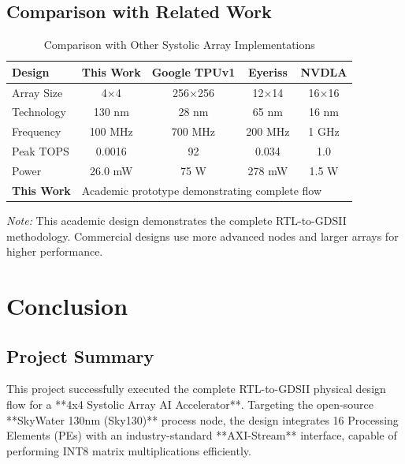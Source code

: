 \documentclass[12pt,a4paper]{article}
\begin{document}
\newpage

\subsection{Comparison with Related Work}

\begin{table}[H]
\centering
\caption{Comparison with Other Systolic Array Implementations}
\label{tab:comparison}
\begin{tabular}{@{}lcccc@{}}
\toprule
\textbf{Design} & \textbf{This Work} & \textbf{Google TPUv1} & \textbf{Eyeriss} & \textbf{NVDLA} \\
\midrule
Array Size & 4×4 & 256×256 & 12×14 & 16×16 \\
Technology & 130 nm & 28 nm & 65 nm & 16 nm \\
Frequency & 100 MHz & 700 MHz & 200 MHz & 1 GHz \\
Peak TOPS & 0.0016 & 92 & 0.034 & 1.0 \\
Power & 26.0 mW & 75 W & 278 mW & 1.5 W \\
\midrule
\textbf{This Work} & \multicolumn{4}{l}{Academic prototype demonstrating complete flow} \\
\bottomrule
\end{tabular}
\end{table}

\textit{Note:} This academic design demonstrates the complete RTL-to-GDSII methodology. Commercial designs use more advanced nodes and larger arrays for higher performance.

\newpage

\section{Conclusion}

\subsection{Project Summary}

This project successfully executed the complete RTL-to-GDSII physical design flow for a **4x4 Systolic Array AI Accelerator**. Targeting the open-source **SkyWater 130nm (Sky130)** process node, the design integrates 16 Processing Elements (PEs) with an industry-standard **AXI-Stream** interface, capable of performing INT8 matrix multiplications efficiently.
\end{document}
